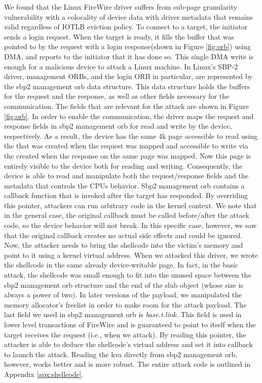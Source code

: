 We found that the Linux FireWire driver suffers from sub-page granularity vulnerability with a colocality of device data with driver metadata that remains valid regardless of IOTLB eviction policy. To connect to a target, the initiator sends a login request. When the target is ready, it fills the buffer that was pointed to by the request with a login response(shown in Figure \ref{fig:orb}) using DMA, and reports to the initiator that it has done so. This single DMA write is enough for a malicious device to attack a Linux machine. In Linux’s SBP-2 driver, management ORBs, and the login ORB in particular, are represented by the sbp2 management orb data structure. This data structure holds the buffers for the request and the response, as well as other fields necessary for the communication. The fields that are relevant for the attack are shown in Figure \ref{fig:orb}. In order to enable the communication, the driver maps the request and response fields in sbp2 management orb for read and write by the device, respectively. As a result, the device has the same 4k page accessible to read using the \iova that was created when the request was mapped and accessible to write via the \iova created when the response on the same page was mapped. Now this page is entirely visible to the device both for reading and writing. Consequently, the device is able to read and manipulate both the request/response fields and the metadata that controls the CPUs behavior. Sbp2 management orb contains a callback function that is invoked after the target has responded. By overriding this pointer, attackers can run arbitrary code in the kernel context. We note that in the general case, the original callback must be called before/after the attack code, so the device behavior will not break. In this specific case, however, we saw that the original callback creates no actual side effects and could be ignored. Now, the attacker needs to bring the shellcode into the victim’s memory and point to it using a kernel virtual address. When we attacked this driver, we wrote the shellcode in the same already device-writable page. In fact, in the basic attack, the shellcode was small enough to fit into the unused space between the sbp2 management orb structure and the end of the slub object (whose size is always a power of two). In later versions of the payload, we manipulated the memory allocator’s freelist in order to make room for the attack payload. The last field we used in sbp2 management orb is \textit{base.t.link}. This field is used in lower level transactions of FireWire and is guaranteed to point to itself when the target receives the request (i.e., when we attack). By reading this pointer, the attacker is able to deduce the shellcode’s virtual address and set it into callback to launch the attack. Reading the kva directly from sbp2 management orb, however, works better and is more robust. The entire attack code is outlined in  Appendix \ref{apx:shellcode}.
